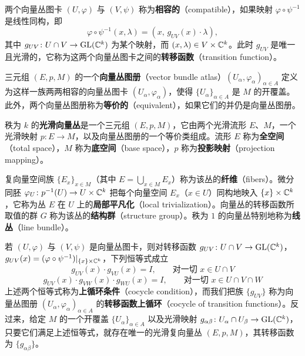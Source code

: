 \begin{definition}[3.2]
两个向量丛图卡 $(U,\varphi)$ 与 $(V,\psi)$ 称为\textbf{相容的}（compatible），如果映射 $\varphi\circ\psi^{-1}$ 是线性同构，即
\[
\varphi\circ\psi^{-1}(x,\lambda)=(x,\,g_{UV}(x)\cdot\lambda),
\]
其中 $g_{UV}\colon U\cap V\to\operatorname{GL}(\mathbb{C}^k)$ 为某个映射，而 $(x,\lambda)\in V\times\mathbb{C}^k$。此时 $g_{UV}$ 是唯一且光滑的，它称为这两个向量丛图卡之间的\textbf{转移函数}（transition function）。
\end{definition}

\begin{definition}[3.3]
三元组 $(E,p,M)$ 的一个\textbf{向量丛图册}（vector bundle atlas）$(U_\alpha,\varphi_\alpha)_{\alpha\in A}$ 定义为这样一族两两相容的向量丛图卡 $(U_\alpha,\varphi_\alpha)$，使得 $\{U_\alpha\}_{\alpha\in A}$ 是 $M$ 的开覆盖。此外，两个向量丛图册称为\textbf{等价的}（equivalent），如果它们的并仍是向量丛图册。
\end{definition}

\begin{definition}[3.4]
秩为 $k$ 的\textbf{光滑向量丛}是一个三元组 $(E,p,M)$，它由两个光滑流形 $E$、$M$，一个光滑映射 $p\colon E\to M$，以及向量丛图册的一个等价类组成。流形 $E$ 称为\textbf{全空间}（total space），$M$ 称为\textbf{底空间}（base space），$p$ 称为\textbf{投影映射}（projection mapping）。
\end{definition}

复向量空间族 $\{E_x\}_{x\in M}$（其中 $E=\bigcup_{x\in M}E_x$）称为该丛的\textbf{纤维}（fibers）。微分同胚 $\varphi_U\colon p^{-1}(U)\to U\times\mathbb{C}^k$ 把每个向量空间 $E_x$（$x\in U$）同构地映入 $\{x\}\times\mathbb{C}^k$，它称为丛 $E$ 在 $U$ 上的\textbf{局部平凡化}（local trivialization）。向量丛的转移函数所取值的群 $G$ 称为该丛的\textbf{结构群}（structure group）。秩为 $1$ 的向量丛特别地称为\textbf{线丛}（line bundle）。

若 $(U,\varphi)$ 与 $(V,\psi)$ 是向量丛图卡，则对转移函数 $g_{UV}\colon U\cap V\to\operatorname{GL}(\mathbb{C}^k)$，$g_{UV}(x)=(\varphi\circ\psi^{-1})|_{\{x\}\times\mathbb{C}^k}$，下列恒等式成立
\begin{equation}
g_{UV}(x)\cdot g_{VU}(x)=I,\qquad \text{对一切 } x\in U\cap V \tag{3.1}
\end{equation}
\begin{equation}
g_{UV}(x)\cdot g_{VW}(x)\cdot g_{WU}(x)=I,\qquad \text{对一切 } x\in U\cap V\cap W \tag{3.2}
\end{equation}
上述两个恒等式称为\textbf{上循环条件}（cocycle condition），而我们把族 $\{g_{UV}\}$ 称为向量丛图册 $(U_\alpha,\varphi_\alpha)_{\alpha\in A}$ 的\textbf{转移函数上循环}（cocycle of transition functions）。反过来，给定 $M$ 的一个开覆盖 $\{U_\alpha\}_{\alpha\in A}$ 以及光滑映射 $g_{\alpha\beta}\colon U_\alpha\cap U_\beta\to\operatorname{GL}(\mathbb{C}^k)$，只要它们满足上述恒等式，就存在唯一的光滑复向量丛 $(E,p,M)$，其转移函数为 $\{g_{\alpha\beta}\}$。


